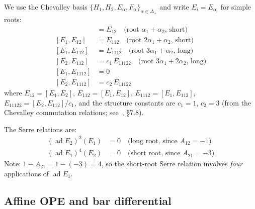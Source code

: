 \begin{computation}\label{comp:G2-structure}
We use the Chevalley basis
$\{H_1, H_2, E_\alpha, F_\alpha\}_{\alpha \in \Delta_+}$
and write $E_i = E_{\alpha_i}$ for simple roots:
\begin{align}
[E_1, E_2] &= E_{12} \quad\text{(root $\alpha_1+\alpha_2$, short)} \\
[E_1, E_{12}] &= E_{112} \quad\text{(root $2\alpha_1+\alpha_2$, short)} \\
[E_1, E_{112}] &= E_{1112} \quad\text{(root $3\alpha_1+\alpha_2$, long)} \\
[E_2, E_{112}] &= c_{1}\, E_{11122}
  \quad\text{(root $3\alpha_1+2\alpha_2$, long)} \\
[E_1, E_{1112}] &= 0 \\
[E_2, E_{1112}] &= c_{2}\, E_{11122}
\end{align}
where $E_{12} = [E_1, E_2]$, $E_{112} = [E_1, E_{12}]$,
$E_{1112} = [E_1, E_{112}]$,
$E_{11122} = [E_2, E_{112}]/c_1$, and the
structure constants are
$c_1 = 1$, $c_2 = 3$
(from the Chevalley commutation relations;
see~\cite{Kac}, \S7.8).

The Serre relations are:
\begin{align}
(\operatorname{ad} E_2)^2(E_1) &= 0
  \quad\text{(long root, since $A_{12} = -1$)}
  \label{eq:serre-G2-long} \\
(\operatorname{ad} E_1)^4(E_2) &= 0
  \quad\text{(short root, since $A_{21} = -3$)}
  \label{eq:serre-G2-short}
\end{align}
Note: $1 - A_{21} = 1 - (-3) = 4$, so the short-root Serre
relation involves \emph{four} applications of $\operatorname{ad} E_1$.
\end{computation}

\subsection{Affine OPE and bar differential}

